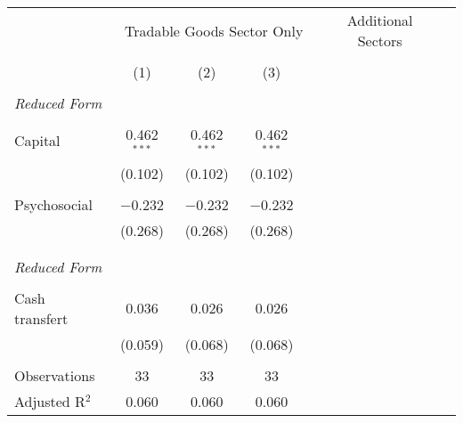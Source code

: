 \begin{tabular}{@{\extracolsep{5pt}}lccc} 
\\[-1.8ex]
& \multicolumn{4}{c}{Tradable Goods Sector Only} & \multicolumn{3}{c}{Additional Sectors} & \cmidrule(lr){2-5} \cmidrule(lr){6-8}

\\[-1.8ex]\\[-1.8ex] & (1) & (2) & (3)\\ 
\hline \\\emph{Reduced Form} \\
\\[-1.8ex] Capital & 0.462$^{***}$ & 0.462$^{***}$ & 0.462$^{***}$ \\ 
  & (0.102) & (0.102) & (0.102) \\ 
  & & & \\ 
 Psychosocial & $-$0.232 & $-$0.232 & $-$0.232 \\ 
  & (0.268) & (0.268) & (0.268) \\ 
  & & & \\ 
\hline \\\emph{Reduced Form} \\
\\[-1.8ex] Cash transfert & 0.036 & 0.026 & 0.026 \\ 
  & (0.059) & (0.068) & (0.068) \\ 
  & & & \\ 
Observations & 33 & 33 & 33 \\  Adjusted R$^{2}$ & 0.060 & 0.060 & 0.060 \\  
\hline\hline
\end{tabular}
